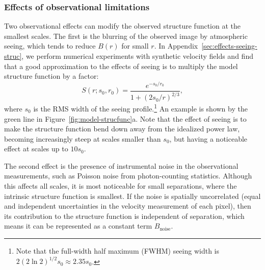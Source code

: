 \documentclass[fleqn,usenatbib, useAMS, a4paper]{mnras}
\begin{document}

\subsubsection{Effects of observational limitations}
\label{sec:effect-observ-limit}

Two observational effects can modify the observed structure function at the smallest scales.
The first is the blurring of the observed image by atmospheric seeing,
which tends to reduce \(B(r)\) for small \(r\).
In Appendix~\ref{sec:effects-seeing-struc}, we perform numerical experiments
with synthetic velocity fields and find that
a good approximation to the effects of seeing is to multiply
the model structure function by a factor:
\begin{equation}\label{eq:ffs}
   S(r; s_0, r_0) = \frac{
    e^{-s_0 / r_0}
  }{
    1+(2s_0 / r)^{2 / 3}
  } ,
\end{equation}
where \(s_0\) is the RMS width of the seeing profile.\footnote{%
  Note that the full-width half maximum (FWHM) seeing width is
  \(2 (2 \ln 2)^{1/2} s_0 \approx 2.35 s_0\).
}
An example is shown by the green line in Figure~\ref{fig:model-strucfunc}a.
Note that the effect of seeing is to make the structure function 
bend down away from the idealized power law, 
becoming increasingly steep at scales smaller than \(s_0\),
but having a noticeable effect at scales up to \(10 s_0\).

The second effect is the presence of instrumental noise
in the observational measurements,
such as Poisson noise from photon-counting statistics. 
Although this affects all scales,
it is most noticeable for small separations,
where the intrinsic structure function is smallest.
If the noise is spatially uncorrelated
(equal and independent uncertainties in the velocity
measurement of each pixel),
then its contribution to the structure function is independent of separation,
which means it can be represented as a constant term \(B_{\text{noise}}\).
\end{document}

